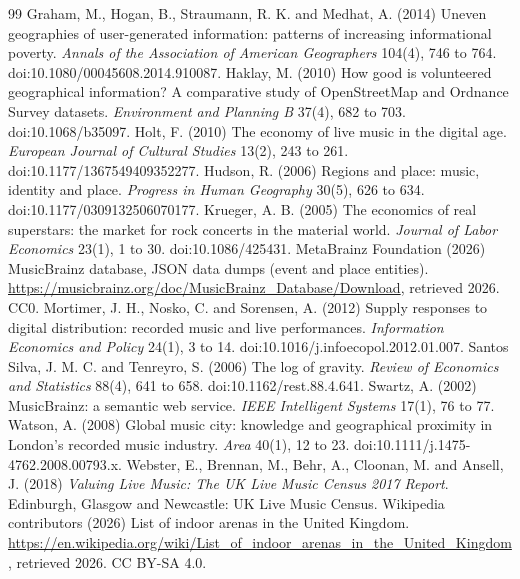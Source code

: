 \documentclass[11pt,a4paper]{article}
\begin{document}
\begin{thebibliography}{99}
 Graham, M., Hogan, B., Straumann, R. K. and Medhat, A. (2014) Uneven geographies of user-generated information: patterns of increasing informational poverty. \textit{Annals of the Association of American Geographers} 104(4), 746 to 764. doi:10.1080/00045608.2014.910087.
 Haklay, M. (2010) How good is volunteered geographical information? A comparative study of OpenStreetMap and Ordnance Survey datasets. \textit{Environment and Planning B} 37(4), 682 to 703. doi:10.1068/b35097.
 Holt, F. (2010) The economy of live music in the digital age. \textit{European Journal of Cultural Studies} 13(2), 243 to 261. doi:10.1177/1367549409352277.
 Hudson, R. (2006) Regions and place: music, identity and place. \textit{Progress in Human Geography} 30(5), 626 to 634. doi:10.1177/0309132506070177.
 Krueger, A. B. (2005) The economics of real superstars: the market for rock concerts in the material world. \textit{Journal of Labor Economics} 23(1), 1 to 30. doi:10.1086/425431.
 MetaBrainz Foundation (2026) MusicBrainz database, JSON data dumps (event and place entities). \url{https://musicbrainz.org/doc/MusicBrainz_Database/Download}, retrieved 2026. CC0.
 Mortimer, J. H., Nosko, C. and Sorensen, A. (2012) Supply responses to digital distribution: recorded music and live performances. \textit{Information Economics and Policy} 24(1), 3 to 14. doi:10.1016/j.infoecopol.2012.01.007.
 Santos Silva, J. M. C. and Tenreyro, S. (2006) The log of gravity. \textit{Review of Economics and Statistics} 88(4), 641 to 658. doi:10.1162/rest.88.4.641.
 Swartz, A. (2002) MusicBrainz: a semantic web service. \textit{IEEE Intelligent Systems} 17(1), 76 to 77.
 Watson, A. (2008) Global music city: knowledge and geographical proximity in London's recorded music industry. \textit{Area} 40(1), 12 to 23. doi:10.1111/j.1475-4762.2008.00793.x.
 Webster, E., Brennan, M., Behr, A., Cloonan, M. and Ansell, J. (2018) \textit{Valuing Live Music: The UK Live Music Census 2017 Report}. Edinburgh, Glasgow and Newcastle: UK Live Music Census.
 Wikipedia contributors (2026) List of indoor arenas in the United Kingdom. \url{https://en.wikipedia.org/wiki/List_of_indoor_arenas_in_the_United_Kingdom}, retrieved 2026. CC BY-SA 4.0.
\end{thebibliography}
\end{document}
